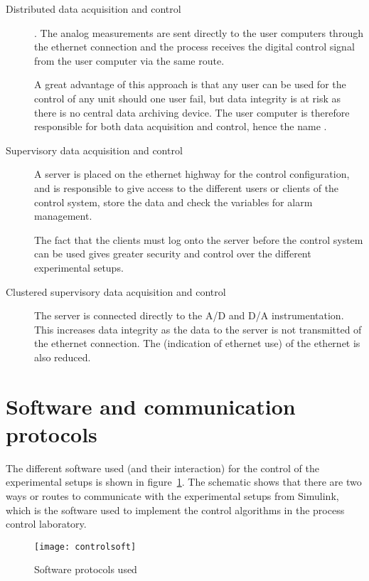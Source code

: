 \begin{description}
	\item [Distributed data acquisition and control]. The analog measurements are sent directly to the user computers through the ethernet connection and the process receives the digital control signal from the user computer via the same route. 
	
A great advantage of this approach is that any user can be used for the control of any unit should one user fail, but data integrity is at risk as there is no central data archiving device. The user computer is therefore responsible for both data acquisition and control, hence the name .   

\item[Supervisory data acquisition and control] A server is placed on the ethernet highway for the control configuration, and is responsible to give access to the different users or clients of the control system, store the data and check the  variables for alarm management. 

The fact that the clients must log onto the server before the control system can be used gives greater security and control over the different experimental setups. 

\item[Clustered supervisory data acquisition and control] The server is connected directly to the A/D and D/A instrumentation. This increases data integrity as the data to the server is not transmitted of the ethernet connection. The  (indication of ethernet use) of the ethernet is also reduced.
\end{description}

\section{Software and communication protocols}
The different software used (and their interaction) for the control of the experimental setups is shown in figure~\ref{fig:control:soft}. The schematic shows that there are two ways or routes to communicate with the experimental setups from Simulink, which is the software used to implement the control algorithms in the process control laboratory. 
\begin{figure}[htbp]
	\centering
	\texttt{[image: controlsoft]}
	\caption{Software protocols used}
	\label{fig:control:soft}
\end{figure}

